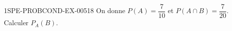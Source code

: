 \begin{exercice}{1SPE-PROBCOND-EX-005}{1}{8}
On donne $P(A) = \dfrac{7}{10}$ et $P(A \cap B) = \dfrac{7}{20}$. Calculer $P_A(B)$.
\end{exercice}
